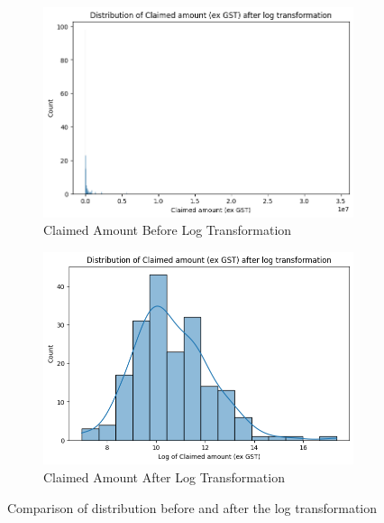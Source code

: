 \documentclass[12pt, b4paper]{article}
\begin{document}
\begin{enumerate}
\begin{itemize}
\begin{figure}
        \centering
        \begin{subfigure}{.5\textwidth}
          \centering
          \includegraphics[width=.8\linewidth]{plots/distClaimAmountBeforeLog.png}
          \caption{Claimed Amount Before Log Transformation}
        \end{subfigure}
        \begin{subfigure}{.5\textwidth}
          \centering
          \includegraphics[width=.8\linewidth]{plots/distClaimAmountAfterLog.png}
          \caption{Claimed Amount After Log Transformation}
        \end{subfigure}
      \caption{Comparison of distribution before and after the log transformation}
      \label{fig:BBlogTrans}
      \end{figure}
            

\end{itemize}
\end{enumerate}
\end{document}
